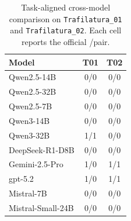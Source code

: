 \begin{table}[t]
\caption{Task-aligned cross-model comparison on \texttt{Trafilatura\_01} and \texttt{Trafilatura\_02}. Each cell reports the official \processmetric/\resultmetric pair.}
\label{tab:shared-trafilatura}
\centering
\small
\begin{tabular}{lcc}
\toprule
\rowcolor{cyan!12}
Model & T01 & T02 \\
\midrule
\rowcolors{2}{cyan!4}{white}
Qwen2.5-14B & 0/0 & 0/0 \\
Qwen2.5-32B & 0/0 & 0/0 \\
Qwen2.5-7B & 0/0 & 0/0 \\
Qwen3-14B & 0/0 & 0/0 \\
Qwen3-32B & 1/1 & 0/0 \\
DeepSeek-R1-D8B & 0/0 & 0/0 \\
Gemini-2.5-Pro & 1/0 & 1/1 \\
gpt-5.2 & 1/0 & 1/1 \\
Mistral-7B & 0/0 & 0/0 \\
Mistral-Small-24B & 0/0 & 0/0 \\
\bottomrule
\end{tabular}
\end{table}
